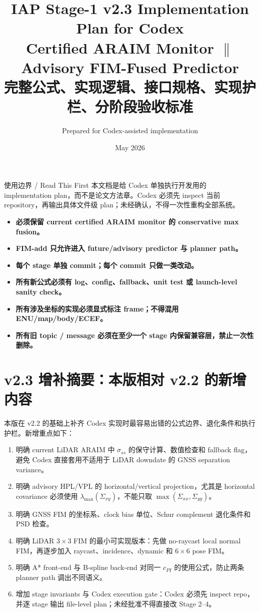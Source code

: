 \documentclass[11pt,a4paper]{article}
\title{\textbf{IAP Stage-1 v2.3 Implementation Plan for Codex}\\[3pt]
  \large Certified ARAIM Monitor $\parallel$ Advisory FIM-Fused Predictor\\[2pt]
\normalsize 完整公式、实现逻辑、接口规格、实现护栏、分阶段验收标准}
\author{Prepared for Codex-assisted implementation}
\date{May 2026}
\begin{document}
\maketitle
\vspace{-1.2em}

\begin{warningbox}{使用边界 / Read This First}
  本文档是给 Codex 单独执行开发用的 implementation plan，而不是论文方法章。Codex 必须先 inspect 当前 repository，再输出具体文件级 plan；未经确认，不得一次性重构全部系统。
  \begin{itemize}
    \item \textbf{必须保留 current certified ARAIM monitor 的 conservative max fusion。}
    \item \textbf{FIM-add 只允许进入 future/advisory predictor 与 planner path。}
    \item \textbf{每个 stage 单独 commit；每个 commit 只做一类改动。}
    \item \textbf{所有新公式必须有 log、config、fallback、unit test 或 launch-level sanity check。}
    \item \textbf{所有涉及坐标的实现必须显式标注 frame；不得混用 ENU/map/body/ECEF。}
    \item \textbf{所有旧 topic / message 必须在至少一个 stage 内保留兼容层，禁止一次性删除。}
  \end{itemize}
\end{warningbox}

\tableofcontents
\newpage


\section{v2.3 增补摘要：本版相对 v2.2 的新增内容}

本版在 v2.2 的基础上补齐 Codex 实现时最容易出错的公式边界、退化条件和执行护栏。新增重点如下：
\begin{enumerate}
  \item 明确 current LiDAR ARAIM 中 $\sigma_{ss}$ 的保守计算、数值检查和 fallback flag，避免 Codex 直接套用不适用于 LiDAR downdate 的 GNSS separation variance。
  \item 明确 advisory HPL/VPL 的 horizontal/vertical projection，尤其是 horizontal covariance 必须使用 $\lambda_{\max}(\Sigma_{xy})$，不能只取 $\max(\Sigma_{xx},\Sigma_{yy})$。
  \item 明确 GNSS FIM 的坐标系、clock bias 单位、Schur complement 退化条件和 PSD 检查。
  \item 明确 LiDAR $3\times3$ FIM 的最小可实现版本：先做 no-raycast local normal FIM，再逐步加入 raycast、incidence、dynamic 和 $6\times6$ pose FIM。
  \item 明确 A* front-end 与 B-spline back-end 对同一 $c_{PI}$ 的使用公式，防止两条 planner path 调出不同语义。
  \item 增加 stage invariants 与 Codex execution gate：Codex 必须先 inspect repo，并逐 stage 输出 file-level plan；未经批准不得直接改 Stage 2--4。
\end{enumerate}
\end{document}
